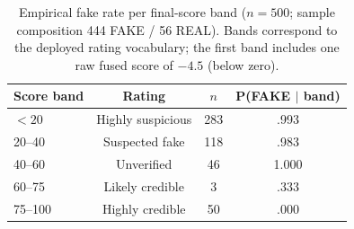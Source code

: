 \begin{table}[!htbp]
\caption{Empirical fake rate per final-score band ($n=500$; sample composition 444 FAKE / 56 REAL). Bands correspond to the deployed rating vocabulary; the first band includes one raw fused score of $-4.5$ (below zero).}
\label{tab:calibration}
\centering
\begin{tabular}{lccc}
\toprule
\textbf{Score band} & \textbf{Rating} & \textbf{$n$} & \textbf{P(FAKE $\mid$ band)} \\
\midrule
$<20$   & Highly suspicious & 283 & .993 \\
20--40  & Suspected fake    & 118 & .983 \\
40--60  & Unverified        & 46  & 1.000 \\
60--75  & Likely credible   & 3   & .333 \\
75--100 & Highly credible   & 50  & .000 \\
\bottomrule
\end{tabular}
\end{table}
